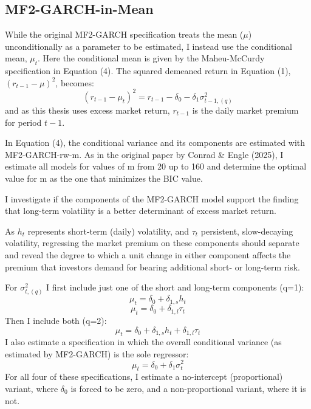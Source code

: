 \documentclass[12pt]{article}
\begin{document}
\subsection{MF2-GARCH-in-Mean}
While the original MF2-GARCH specification treats the mean ($\mu$) unconditionally as a parameter to be estimated, I instead use the conditional mean, $\mu_t$. Here the conditional mean is given by the Maheu-McCurdy specification in Equation (4). The squared demeaned return in Equation (1), $(r_{t-1}-\mu)^2$, becomes:
\begin{equation}
\nonumber
(r_{t-1}-\mu_t)^2=r_{t-1}-\delta_0-\delta_1\sigma_{t-1,(q)}^2
\end{equation}
and as this thesis uses excess market return, $r_{t-1}$ is the daily market premium for period $t-1$.\par
In Equation (4), the conditional variance and its components are estimated with MF2-GARCH-rw-m. As in the original paper by Conrad \& Engle (2025), I estimate all models for values of m from 20 up to 160 and determine the optimal value for m as the one that minimizes the BIC value.\par
I investigate if the components of the MF2-GARCH model support the finding that long-term volatility is a better determinant of excess market return.\par
As $h_t$ represents short-term (daily) volatility, and $\tau_t$ persistent, slow-decaying volatility, regressing the market premium on these components should separate and reveal the degree to which a unit change in either component affects the premium that investors demand for bearing additional short- or long-term risk.\par 
\noindent For $\sigma_{t,(q)}^2$ I first include just one of the short and long-term components (q=1):
\begin{equation}
\nonumber
\mu_t=\delta_0+\delta_{1,s}h_t
\end{equation}
\begin{equation}
\nonumber
\mu_t=\delta_0+\delta_{1,l}\tau_t
\end{equation}
Then I include both (q=2):
\begin{equation}
\nonumber
\mu_t=\delta_0+\delta_{1,s}h_t+\delta_{1,l}\tau_t
\end{equation}
I also estimate a specification in which the overall conditional variance (as estimated by MF2-GARCH) is the sole regressor:
\begin{equation}
\nonumber
\mu_t=\delta_0+\delta_1\sigma_t^2
\end{equation}
For all four of these specifications, I estimate a no-intercept (proportional) variant, where $\delta_0$ is forced to be zero, and a non-proportional variant, where it is not.
\end{document}
